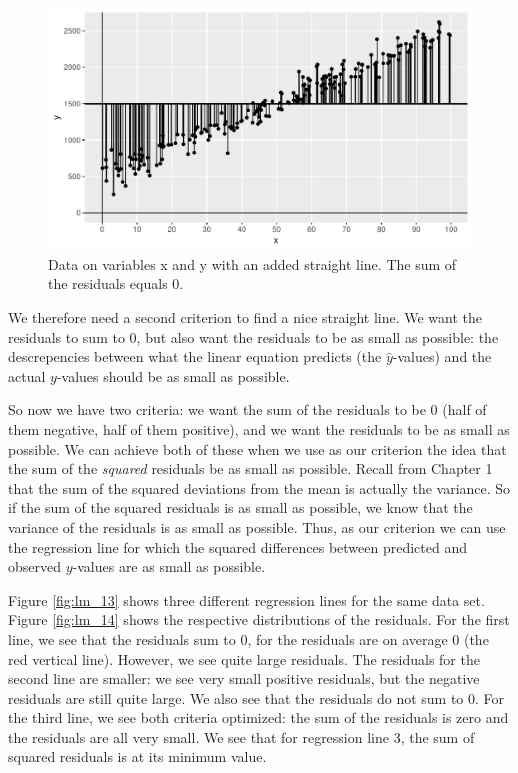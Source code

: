 \documentclass[]{report}\usepackage[]{graphicx}\usepackage[]{color}
\makeatletter
\def\maxwidth{ %
  \ifdim\Gin@nat@width>\linewidth
    \linewidth
  \else
    \Gin@nat@width
  \fi
}
\newenvironment{knitrout}{}{} %
\makeatother
\begin{document}
\begin{knitrout}
\color{fgcolor}\begin{figure}

{\centering \includegraphics[width=\maxwidth]{figure/lm_12-1} 

}

\caption[Data on variables x and y with an added straight line]{Data on variables x and y with an added straight line. The sum of the residuals equals 0.}\label{fig:lm_12}
\end{figure}


\end{knitrout}

We therefore need a second criterion to find a nice straight line. We want the residuals to sum to 0, but also want the residuals to be as small as possible: the descrepencies between what the linear equation predicts (the $\hat{y}$-values) and the actual $y$-values should be as small as possible.

So now we have two criteria: we want the sum of the residuals to be 0 (half of them negative, half of them positive), and we want the residuals to be as small as possible. We can achieve both of these when we use as our criterion the idea that the sum of the \textit{squared} residuals be as small as possible. Recall from Chapter 1 that the sum of the squared deviations from the mean is actually the variance. So if the sum of the squared residuals is as small as possible, we know that the variance of the residuals is as small as possible. Thus, as our criterion we can use the regression line for which the squared differences between predicted and observed $y$-values are as small as possible.

Figure \ref{fig:lm_13} shows three different regression lines for the same data set. Figure \ref{fig:lm_14} shows the respective distributions of the residuals. For the first line, we see that the residuals sum to 0, for the residuals are on average 0 (the red vertical line). However, we see quite large residuals. The residuals for the second line are smaller: we see very small positive residuals, but the negative residuals are still quite large. We also see that the residuals do not sum to 0. For the third line, we see both criteria optimized: the sum of the residuals is zero and the residuals are all very small. We see that for regression line 3, the sum of squared residuals is at its minimum value.
\end{document}
